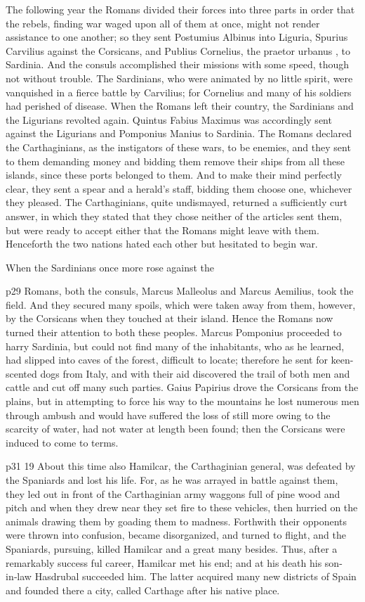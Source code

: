 The following year the Romans divided their forces into three parts in order that the rebels, finding war waged upon all of them at once, might not render assistance to one another; so they sent Postumius Albinus into Liguria, Spurius Carvilius against the Corsicans, and Publius Cornelius, the praetor urbanus , to Sardinia. And the consuls accomplished their missions with some speed, though not without trouble. The Sardinians, who were animated by no little spirit, were vanquished in a fierce battle by Carvilius; for Cornelius and many of his soldiers had perished of disease. When the Romans left their country, the Sardinians and the Ligurians revolted again. Quintus Fabius Maximus was accordingly sent against the Ligurians and Pomponius Manius to Sardinia. The Romans declared the Carthaginians, as the instigators of these wars, to be enemies, and they sent to them demanding money and bidding them remove their ships from all these islands, since these ports belonged to them. And to make their mind perfectly clear, they sent a spear and a herald's staff, bidding them choose one, whichever they pleased. The Carthaginians, quite undismayed, returned a sufficiently curt answer, in which they stated that they chose neither of the articles sent them, but were ready to accept either that the Romans might leave with them. Henceforth the two nations hated each other but hesitated to begin war.

When the Sardinians once more rose against the

p29 Romans, both the consuls, Marcus Malleolus and Marcus Aemilius, took the field. And they secured many spoils, which were taken away from them, however, by the Corsicans when they touched at their island. Hence the Romans now turned their attention to both these peoples. Marcus Pomponius proceeded to harry Sardinia, but could not find many of the inhabitants, who as he learned, had slipped into caves of the forest, difficult to locate; therefore he sent for keen-scented dogs from Italy, and with their aid discovered the trail of both men and cattle and cut off many such parties. Gaius Papirius drove the Corsicans from the plains, but in attempting to force his way to the mountains he lost numerous men through ambush and would have suffered the loss of still more owing to the scarcity of water, had not water at length been found; then the Corsicans were induced to come to terms.

p31
19 About this time also Hamilcar, the Carthaginian general, was defeated by the Spaniards and lost his life. For, as he was arrayed in battle against them, they led out in front of the Carthaginian army waggons full of pine wood and pitch and when they drew near they set fire to these vehicles, then hurried on the animals drawing them by goading them to madness. Forthwith their opponents were thrown into confusion, became disorganized, and turned to flight, and the Spaniards, pursuing, killed Hamilcar and a great many besides. Thus, after a remarkably success ­ful career, Hamilcar met his end; and at his death his son-in\texthebrew{‑}law Hasdrubal succeeded him. The latter acquired many new districts of Spain and founded there a city, called Carthage after his native place.

